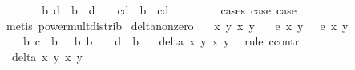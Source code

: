 \begin{isabellebody}
\ \ \isanewline
\ \ \isamarkupfalse%
\ {\isachardoublequoteopen}{\isasymexists}\ b{\isachardot}\ {\isacharparenleft}{}{\isacharslash}d\ {\isacharequal}\ b{\isacharcircum}{}\ {\isasymand}\ {}{\isacharslash}d\ {\isasymnoteq}\ {}{\isacharparenright}\ {\isasymor}\ {\isacharparenleft}{}{\isacharslash}{\isacharparenleft}c{\isacharasterisk}d{\isacharparenright}\ {\isacharequal}\ b{\isacharcircum}{}\ {\isasymand}\ {}{\isacharslash}{\isacharparenleft}c{\isacharasterisk}d{\isacharparenright}\ {\isasymnoteq}\ {}{\isacharparenright}{\isachardoublequoteclose}\ \isanewline
\ \ \ \ \isamarkupfalse%
\ cases\ case{}\ case{}\ \isamarkupfalse%
\ {\isacharparenleft}metis\ power{\isacharunderscore}mult{\isacharunderscore}distrib{\isacharparenright}\isanewline
{}\isamarkupfalse%
%
\endisatagproof
{\isafoldproof}%
%
\isadelimproof
\isanewline
%
\endisadelimproof
\isanewline
{}\isamarkupfalse%
\ delta{\isacharunderscore}non{\isacharunderscore}zero{\isacharcolon}\isanewline
\ \ \ x{}\ y{}\ x{}\ y{}\isanewline
\ \ \ {\isachardoublequoteopen}e\ x{}\ y{}\ {\isacharequal}\ {}{\isachardoublequoteclose}\ {\isachardoublequoteopen}e\ x{}\ y{}\ {\isacharequal}\ {}{\isachardoublequoteclose}\isanewline
\ \ \ {\isachardoublequoteopen}{\isasymexists}\ b{\isachardot}\ {}{\isacharslash}c\ {\isacharequal}\ b{\isacharcircum}{}{\isachardoublequoteclose}\ {\isachardoublequoteopen}{\isasymnot}\ {\isacharparenleft}{\isasymexists}\ b{\isachardot}\ b\ {\isasymnoteq}\ {}\ {\isasymand}\ {}{\isacharslash}d\ {\isacharequal}\ b{\isacharcircum}{}{\isacharparenright}{\isachardoublequoteclose}\isanewline
\ \ \ {\isachardoublequoteopen}delta\ x{}\ y{}\ x{}\ y{}\ {\isasymnoteq}\ {}{\isachardoublequoteclose}\isanewline
%
\isadelimproof
%
\endisadelimproof
%
\isatagproof
{}\isamarkupfalse%
{\isacharparenleft}rule\ ccontr{\isacharparenright}\isanewline
\ \ \isamarkupfalse%
\ {\isachardoublequoteopen}{\isasymnot}\ delta\ x{}\ y{}\ x{}\ y{}\ {\isasymnoteq}\ {}{\isachardoublequoteclose}\isanewline
\ \ \isamarkupfalse%

\end{isabellebody}
